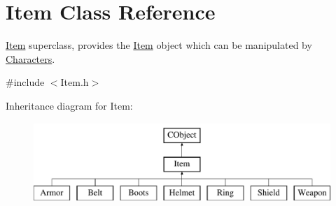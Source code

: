 \hypertarget{class_item}{}\section{Item Class Reference}
\label{class_item}


\hyperlink{class_item}{Item} superclass, provides the \hyperlink{class_item}{Item} object which can be manipulated by \hyperlink{class_characters}{Characters}.  




{\ttfamily \#include $<$Item.\+h$>$}

Inheritance diagram for Item\+:\begin{figure}[H]
\begin{center}
\leavevmode
\includegraphics[height=3.000000cm]{class_item}
\end{center}
\end{figure}
